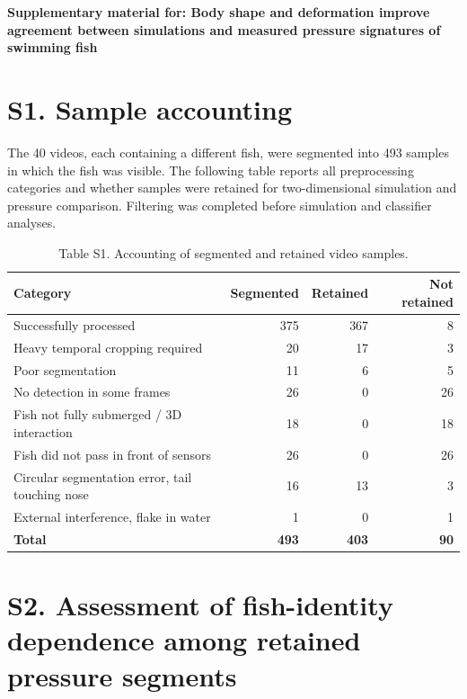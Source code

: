 \documentclass[11pt,a4paper]{article}
\begin{document}
\begin{center}

{\Large\bfseries Supplementary material for: Body shape and deformation improve agreement between simulations and measured pressure signatures of swimming fish\par}

\end{center}

\section*{S1. Sample accounting}

The 40 videos, each containing a different fish, were segmented into 493 samples in which the fish was visible. The following table reports all preprocessing categories and whether samples were retained for two-dimensional simulation and pressure comparison. Filtering was completed before simulation and classifier analyses.

\begin{table}[htbp]
\centering
\caption*{Table S1. Accounting of segmented and retained video samples.}
\begin{tabular}{lrrr}
\toprule
Category & Segmented & Retained & Not retained \\
\midrule
Successfully processed & 375 & 367 & 8 \\
Heavy temporal cropping required & 20 & 17 & 3 \\
Poor segmentation & 11 & 6 & 5 \\
No detection in some frames & 26 & 0 & 26 \\
Fish not fully submerged / 3D interaction & 18 & 0 & 18 \\
Fish did not pass in front of sensors & 26 & 0 & 26 \\
Circular segmentation error, tail touching nose & 16 & 13 & 3 \\
External interference, flake in water & 1 & 0 & 1 \\
\midrule
\textbf{Total} & \textbf{493} & \textbf{403} & \textbf{90} \\
\bottomrule
\end{tabular}
\end{table}

\section*{S2. Assessment of fish-identity dependence among retained pressure segments}
\end{document}
